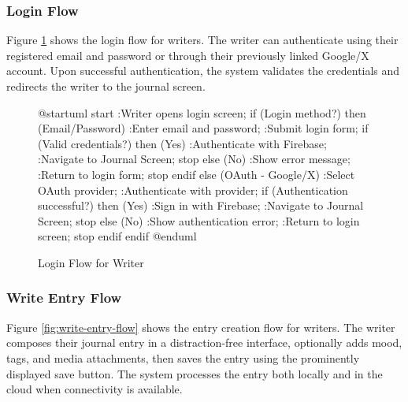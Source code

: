 \subsubsection{Login Flow}\label{subsubsec:loginFlow}

Figure \ref{fig:login-flow} shows the login flow for writers. The writer can authenticate using their registered email and password or through their previously linked Google/X account. Upon successful authentication, the system validates the credentials and redirects the writer to the journal screen.

\begin{figure}[H]
\centering
\begin{plantuml}
@startuml
start
:Writer opens login screen;
if (Login method?) then (Email/Password)
  :Enter email and password;
  :Submit login form;
  if (Valid credentials?) then (Yes)
    :Authenticate with Firebase;
    :Navigate to Journal Screen;
    stop
  else (No)
    :Show error message;
    :Return to login form;
    stop
  endif
else (OAuth - Google/X)
  :Select OAuth provider;
  :Authenticate with provider;
  if (Authentication successful?) then (Yes)
    :Sign in with Firebase;
    :Navigate to Journal Screen;
    stop
  else (No)
    :Show authentication error;
    :Return to login screen;
    stop
  endif
endif
@enduml
\end{plantuml}
\caption{Login Flow for Writer}
\label{fig:login-flow}
\end{figure}

\subsubsection{Write Entry Flow}\label{subsubsec:writeEntryFlow}

Figure \ref{fig:write-entry-flow} shows the entry creation flow for writers. The writer composes their journal entry in a distraction-free interface, optionally adds mood, tags, and media attachments, then saves the entry using the prominently displayed save button. The system processes the entry both locally and in the cloud when connectivity is available.

